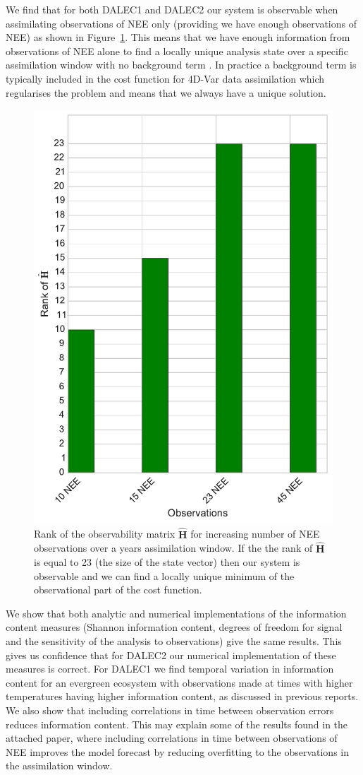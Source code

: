 \documentclass[11pt]{article}
\begin{document}
We find that for both DALEC1 and DALEC2 our system is observable when assimilating observations of NEE only (providing we have enough observations of NEE) as shown in Figure~\ref{fig:hmat}. This means that we have enough information from observations of NEE alone to find a locally unique analysis state over a specific assimilation window with no background term \citep{zou1992incomplete}. In practice a background term is typically included in the cost function for 4D-Var data assimilation which regularises the problem and means that we always have a unique solution.

\begin{figure}
  \centering
  \includegraphics[width=0.5\linewidth]{hmat.pdf}
  \caption{Rank of the observability matrix $\hat{\textbf{H}}$ for increasing number of NEE observations over a years assimilation window. If the the rank of $\hat{\textbf{H}}$ is equal to 23 (the size of the state vector) then our system is observable and we can find a locally unique minimum of the observational part of the cost function.}
  \label{fig:hmat}
\end{figure}

We show that both analytic and numerical implementations of the information content measures (Shannon information content, degrees of freedom for signal and the sensitivity of the analysis to observations) give the same results. This gives us confidence that for DALEC2 our numerical implementation of these measures is correct. For DALEC1 we find temporal variation in information content for an evergreen ecosystem with observations made at times with higher temperatures having higher information content, as discussed in previous reports. We also show that including correlations in time between observation errors reduces information content. This may explain some of the results found in the attached paper, where including correlations in time between observations of NEE improves the model forecast by reducing overfitting to the observations in the assimilation window. 
\end{document}
